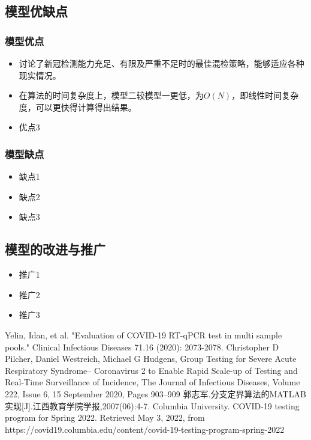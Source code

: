 \documentclass[withoutpreface,bwprint]{cumcmthesis} %
\begin{document}
\subsection{模型优缺点}
\subsubsection{模型优点}
\begin{itemize}
    \item 讨论了新冠检测能力充足、有限及严重不足时的最佳混检策略，能够适应各种现实情况。
    
    \item 在算法的时间复杂度上，模型二较模型一更低，为$O(N)$，即线性时间复杂度，可以更快得计算得出结果。
    
    \item 优点3
\end{itemize}

\subsubsection{模型缺点}
\begin{itemize}
    \item 缺点1
    
    \item 缺点2
    
    \item 缺点3
\end{itemize}


\subsection{模型的改进与推广}
\begin{itemize}
    \item 推广1
    
    \item 推广2
    
    \item 推广3
\end{itemize}


\newpage

\begin{thebibliography}{100}
Yelin, Idan, et al. "Evaluation of COVID-19 RT-qPCR test in multi sample pools." Clinical Infectious Diseases 71.16 (2020): 2073-2078.
Christopher D Pilcher, Daniel Westreich, Michael G Hudgens, Group Testing for Severe Acute Respiratory Syndrome– Coronavirus 2 to Enable Rapid Scale-up of Testing and Real-Time Surveillance of Incidence, The Journal of Infectious Diseases, Volume 222, Issue 6, 15 September 2020, Pages 903–909
郭志军.分支定界算法的MATLAB实现[J].江西教育学院学报,2007(06):4-7.
Columbia University. COVID-19 testing program for Spring 2022. Retrieved May 3, 2022, from https://covid19.columbia.edu/content/covid-19-testing-program-spring-2022 

\end{thebibliography}
\end{document}
